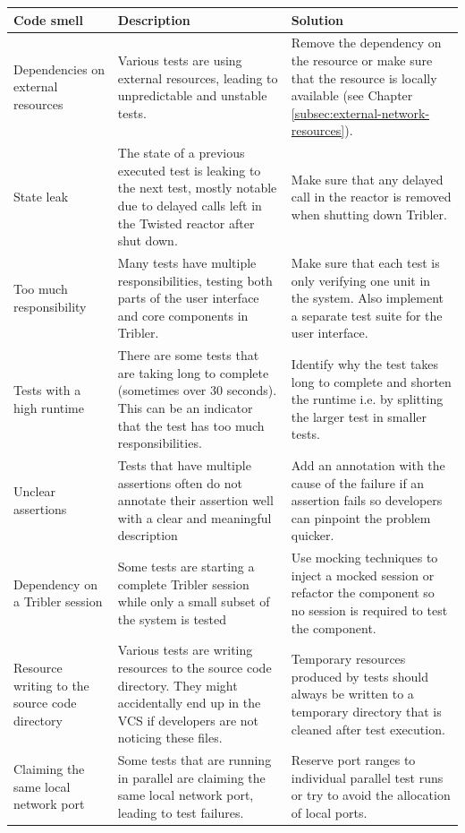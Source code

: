 \begin{table}
	\begin{tabularx}{\textwidth}{|X|X|X|}
		\hline
		\textbf{Code smell} & \textbf{Description} & \textbf{Solution}\\ \hline
		Dependencies on external resources & Various tests are using external resources, leading to unpredictable and unstable tests. & Remove the dependency on the resource or make sure that the resource is locally available (see Chapter \ref{subsec:external-network-resources}). \\ \hline
		State leak & The state of a previous executed test is leaking to the next test, mostly notable due to delayed calls left in the Twisted reactor after shut down. & Make sure that any delayed call in the reactor is removed when shutting down Tribler. \\ \hline
		Too much responsibility & Many tests have multiple responsibilities, testing both parts of the user interface and core components in Tribler. & Make sure that each test is only verifying one unit in the system. Also implement a separate test suite for the user interface.\\ \hline
		Tests with a high runtime & There are some tests that are taking long to complete (sometimes over 30 seconds). This can be an indicator that the test has too much responsibilities. & Identify why the test takes long to complete and shorten the runtime i.e. by splitting the larger test in smaller tests. \\ \hline
		Unclear assertions & Tests that have multiple assertions often do not annotate their assertion well with a clear and meaningful description & Add an annotation with the cause of the failure if an assertion fails so developers can pinpoint the problem quicker.\\ \hline
		Dependency on a Tribler session & Some tests are starting a complete Tribler session while only a small subset of the system is tested & Use mocking techniques to inject a mocked session or refactor the component so no session is required to test the component. \\ \hline
		Resource writing to the source code directory & Various tests are writing resources to the source code directory. They might accidentally end up in the VCS if developers are not noticing these files. & Temporary resources produced by tests should always be written to a temporary directory that is cleaned after test execution. \\ \hline
		Claiming the same local network port & Some tests that are running in parallel are claiming the same local network port, leading to test failures. & Reserve port ranges to individual parallel test runs or try to avoid the allocation of local ports. \\ \hline

\end{tabularx}
\end{table}
